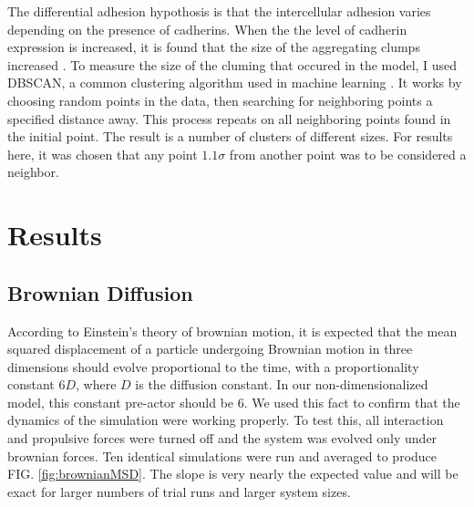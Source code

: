 \documentclass[aps,prb,twocolumn,groupedaddress,nofootinbib,floatfix]{revtex4}
\begin{document}
The differential adhesion hypothosis is that the intercellular adhesion varies depending on the presence of cadherins.
When the the level of cadherin expression is increased, it is found that the size of the aggregating clumps increased \cite{Foty}.
To measure the size of the cluming that occured in the model, I used DBSCAN, a common clustering algorithm used in machine learning \cite{Ester}. 
It works by choosing random points in the data, then searching for neighboring points a specified distance away.
This process repeats on all neighboring points found in the initial point.
The result is a number of clusters of different sizes.
For results here, it was chosen that any point $1.1\sigma$ from another point was to be considered a neighbor.

\section{Results}

\subsection{Brownian Diffusion}
According to Einstein's theory of brownian motion, it is expected that the mean
squared displacement of a particle undergoing Brownian motion in three dimensions should evolve proportional to the time, with a proportionality constant $6 D$, where $D$ is the diffusion constant. In our non-dimensionalized model, this constant pre-actor should be $6$. We used this fact to confirm that the dynamics of the simulation were working properly. To test this, all interaction and propulsive forces were turned off and the system was evolved only under brownian forces. Ten identical simulations were run and averaged to produce FIG. \ref{fig:brownianMSD}. The slope is very nearly the expected value and will be exact for larger numbers of trial runs and larger system sizes.
\end{document}
